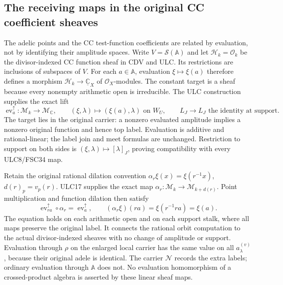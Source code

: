 \subsection{The receiving maps in the original CC coefficient sheaves}

The adelic points and the CC test-function coefficients are related
by evaluation, not by identifying their amplitude spaces. Write
$V=\mathcal S(\mathbb A)$ and let $\mathcal H_k=\mathcal O_k$
be the divisor-indexed CC function sheaf in CDV and ULC.
Its restrictions are inclusions of subspaces of $V$.
For each $a\in\mathbb A$, evaluation $\xi\mapsto\xi(a)$
therefore defines a morphism
$\mathcal H_k\to\underline{\mathbb C}_X$ of
$\mathcal O_X$-modules. The constant target is a sheaf because
every nonempty arithmetic open is irreducible.
The ULC construction supplies the exact lift
\begin{equation}\tag{PLP37}
\operatorname{ev}_a^\uparrow:
\mathcal M_k\longrightarrow\mathcal M_{\mathbb C},
\qquad
(\xi,\lambda)\longmapsto(\xi(a),\lambda)
\text{ on }W_U,\qquad
L_J\longrightarrow L_J\text{ the identity at support}.
\end{equation}
The target lies in the original carrier: a nonzero evaluated
amplitude implies a nonzero original function and hence top
label. Evaluation is additive and rational-linear; the label
join and meet formulas are unchanged. Restriction to support
on both sides is $(\xi,\lambda)\mapsto[\lambda]_J$, proving
compatibility with every ULC8/FSC34 map.

Retain the original rational dilation convention
$\alpha_r\xi(x)=\xi(r^{-1}x)$, $d(r)_p=v_p(r)$.
ULC17 supplies the exact map
$\alpha_r:\mathcal M_k\to\mathcal M_{k+d(r)}$.
Point multiplication and function dilation then satisfy
\begin{equation}\tag{PLP38}
\operatorname{ev}_{ra}^\uparrow\circ\alpha_r
=\operatorname{ev}_a^\uparrow,\qquad
(\alpha_r\xi)(ra)=\xi(r^{-1}ra)=\xi(a).
\end{equation}
The equation holds on each arithmetic open and on each support
stalk, where all maps preserve the original label.
It connects the rational orbit computation to the actual
divisor-indexed sheaves with no change of amplitude or support.
Evaluation through $\rho$ on the enlarged local carrier has
the same value on all $a^{(v)}_\lambda$, because their original
adele is identical. The carrier $\mathcal N$ records the extra
labels; ordinary evaluation through $\mathbb A$ does not.
No evaluation homomorphism of a crossed-product algebra is
asserted by these linear sheaf maps.

